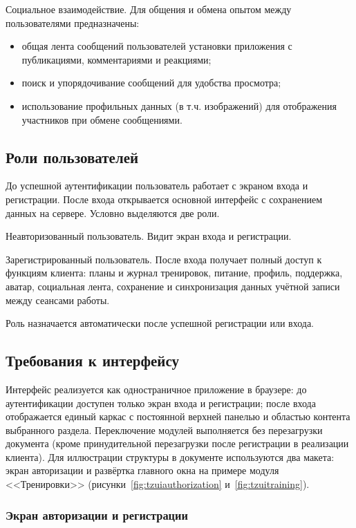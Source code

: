 Социальное взаимодействие. Для общения и обмена опытом между пользователями предназначены:
\begin{itemize}
	\item общая лента сообщений пользователей установки приложения с публикациями, комментариями и реакциями;
	\item поиск и упорядочивание сообщений для удобства просмотра;
	\item использование профильных данных (в т.ч. изображений) для отображения участников при обмене сообщениями.
\end{itemize}

\subsection{Роли пользователей}

До успешной аутентификации пользователь работает с экраном входа и регистрации. После входа открывается основной интерфейс с сохранением данных на сервере. Условно выделяются две роли.

Неавторизованный пользователь. Видит экран входа и регистрации.

Зарегистрированный пользователь. После входа получает полный доступ к функциям клиента: планы и журнал тренировок, питание, профиль, поддержка, аватар, социальная лента, сохранение и синхронизация данных учётной записи между сеансами работы.

Роль назначается автоматически после успешной регистрации или входа.

\subsection{Требования к интерфейсу}

Интерфейс реализуется как одностраничное приложение в браузере: до аутентификации доступен только экран входа и регистрации; после входа отображается единый каркас с постоянной верхней панелью и областью контента выбранного раздела. Переключение модулей выполняется без перезагрузки документа (кроме принудительной перезагрузки после регистрации в реализации клиента). Для иллюстрации структуры в документе используются два макета: экран авторизации и развёртка главного окна на примере модуля <<Тренировки>> (рисунки~\ref{fig:tzuiauthorization} и~\ref{fig:tzuitraining}).

\subsubsection{Экран авторизации и регистрации}

